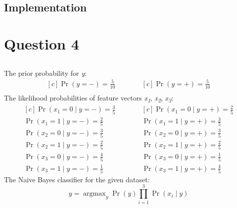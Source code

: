\documentclass{article}
\DeclareMathOperator{\CondProb}{Pr}
\DeclareMathOperator{\argmax}{argmax}
\newcommand{\writex}[2]{{\it{#1\textsubscript#2}}}
\newcommand{\writey}[1]{{\it{#1}}}
\begin{document}
\subsection{Implementation}




\section{Question 4}
\subsection{}
The prior probability for \writey{y}:
\begin{equation*}
	\begin{aligned}[c]
	\CondProb{(y = -)} = \frac{5}{10}\\
	\end{aligned}
	\quad\quad\quad
	\begin{aligned}[c]
	\CondProb{(y = +)} = \frac{5}{10} \\
	\end{aligned}
\end{equation*}
The likelihood probabilities of feature vectors \writex{x}{1}, \writex{x}{2}, \writex{x}{3}:
\begin{equation*}
	\begin{aligned}[c]
	\CondProb{(x_1 = 0 \mid y = -)} = \frac{3}{5} \\
	\CondProb{(x_1 = 1 \mid y = -)} = \frac{2}{5} \\ 
	\CondProb{(x_2 = 0 \mid y = -)} = \frac{3}{5} \\
	\CondProb{(x_2 = 1 \mid y = -)} = \frac{2}{5} \\ 
	\CondProb{(x_3 = 0 \mid y = -)} = \frac{4}{5} \\
	\CondProb{(x_3 = 1 \mid y = -)} = \frac{1}{5}
	\end{aligned}
	\quad\quad\quad
	\begin{aligned}[c]
	\CondProb{(x_1 = 0 \mid y = +)} = \frac{2}{5} \\
	\CondProb{(x_1 = 1 \mid y = +)} = \frac{3}{5} \\ 
	\CondProb{(x_2 = 0 \mid y = +)} = \frac{3}{5} \\
	\CondProb{(x_2 = 1 \mid y = +)} = \frac{2}{5} \\ 
	\CondProb{(x_3 = 0 \mid y = +)} = \frac{1}{5} \\
	\CondProb{(x_3 = 1 \mid y = +)} = \frac{4}{5} 
\end{aligned}
\end{equation*}
The Naive Bayes classifier for the given dataset:
\begin{equation}
y = \argmax_y\CondProb{(y)} \prod_{i=1}^{3} \CondProb{(x_i  \mid y)}
\end{equation}
\end{document}
